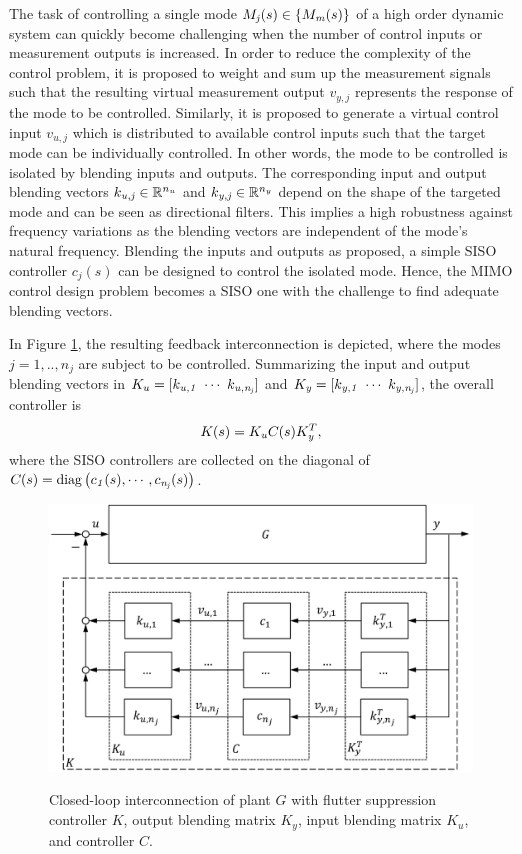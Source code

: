 \documentclass[aerospace,article,submit,moreauthors,pdftex,10pt,a4paper]{Definitions/mdpi}
\begin{document}
The task of controlling a single mode $\aemat{M}{j}(s) \in \{\aemat{M}{m}(s)\}$ of a high order dynamic system can quickly become challenging when the number of control inputs or measurement outputs is increased.
In order to reduce the complexity of the control problem, it is proposed to weight and sum up the measurement signals such that the resulting virtual measurement output $v_{y,j}$ represents the response of the mode to be controlled. Similarly, it is proposed to generate a virtual control input $v_{u,j}$ which is distributed to available control inputs such that the target mode can  be individually controlled.
In other words, the mode to be controlled is isolated by blending inputs and outputs. The corresponding input and output blending vectors $\aevec{k}{u,j} \in \mathbb{R}^{n_u}$ and $\aevec{k}{y,j} \in \mathbb{R}^{n_y}$ depend on the shape of the targeted mode and can be seen as directional filters.
This implies a high robustness against frequency variations as the blending vectors are independent of the mode's natural frequency. 
Blending the inputs and outputs as proposed, a simple \ac{SISO} controller $c_{j}(s)$ can be designed to control the isolated mode. Hence, the \ac{MIMO} control design problem becomes a \ac{SISO} one with the challenge to find adequate blending vectors.

In Figure \ref{fig:clm}, the resulting feedback interconnection is depicted, where the modes $j=1,..,n_j$ are subject to be controlled. 
Summarizing the input and output blending vectors in $K_u=[ \aevec{k}{u,1}~\cdots~\aevec{k}{u,n_j}]$
and 
$\aemat{K}{y}=[\aevec{k}{y,1}~\cdots~\aevec{k}{y,n_j} ]$,
the overall controller is
\begin{align*}
\aemat{K}{}(s)=\aemat{K}{u} \aemat{C}{}(s) \aemat{K}{y}^T,
\end{align*}
where the \ac{SISO} controllers are collected on the diagonal of
$\aemat{C}{}(s)=\diag{\left( \aesym{c}{1}(s), \cdots , \aesym{c}{n_j}(s) \right)}$.

\begin{figure}[!htbp]
	\centering
	{\includegraphics[width=.8\textwidth]{figs/strct.pdf}}
	\caption{Closed-loop interconnection of plant 
		$G$ with flutter suppression controller $K$, output blending matrix $K_y$, input blending matrix $K_u$, and controller $C$.}
	\label{fig:clm}
\end{figure}
\end{document}
